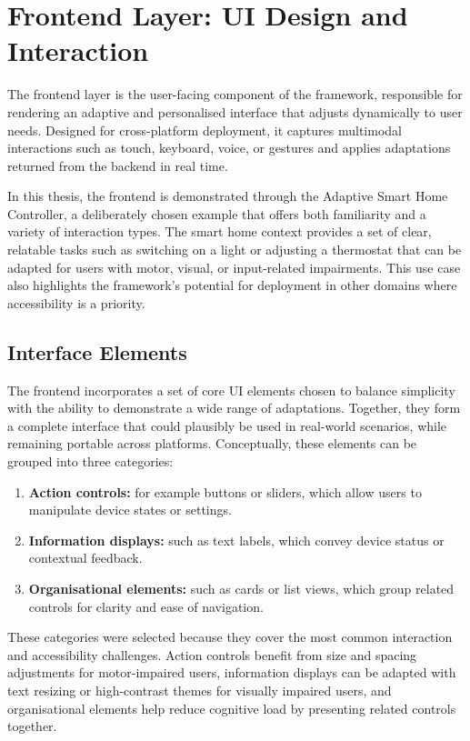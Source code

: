 \documentclass[openany]{book}
\begin{document}
\section{Frontend Layer: UI Design and Interaction}
The frontend layer is the user-facing component of the framework, responsible for rendering an adaptive and personalised interface that adjusts dynamically to user needs. Designed for cross-platform deployment, it captures multimodal interactions such as touch, keyboard, voice, or gestures and applies adaptations returned from the backend in real time.

In this thesis, the frontend is demonstrated through the Adaptive Smart Home Controller, a deliberately chosen example that offers both familiarity and a variety of interaction types. The smart home context provides a set of clear, relatable tasks such as switching on a light or adjusting a thermostat that can be adapted for users with motor, visual, or input-related impairments. This use case also highlights the framework’s potential for deployment in other domains where accessibility is a priority.

\subsection{Interface Elements}
The frontend incorporates a set of core UI elements chosen to balance simplicity with the ability to demonstrate a wide range of adaptations. Together, they form a complete interface that could plausibly be used in real-world scenarios, while remaining portable across platforms. Conceptually, these elements can be grouped into three categories:
\begin{enumerate}
    \item \textbf{Action controls:} for example buttons or sliders, which allow users to manipulate device states or settings.
    \item \textbf{Information displays:} such as text labels, which convey device status or contextual feedback.
    \item \textbf{Organisational elements:} such as cards or list views, which group related controls for clarity and ease of navigation.
\end{enumerate}
These categories were selected because they cover the most common interaction and accessibility challenges. Action controls benefit from size and spacing adjustments for motor-impaired users, information displays can be adapted with text resizing or high-contrast themes for visually impaired users, and organisational elements help reduce cognitive load by presenting related controls together.
\end{document}
